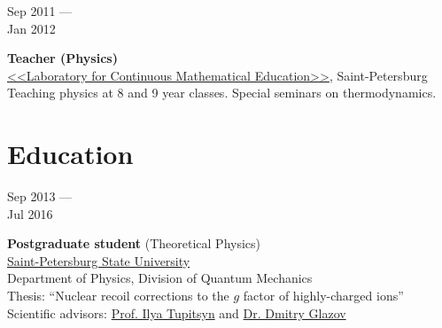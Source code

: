 \documentclass[10pt,a4paper]{article}
\newcommand{\lmpratio}{0.15}
\newcommand{\rmpratio}{0.74}
\newcommand{\verticalSpace}{0.3cm}
\newcommand{\vSpace}{0.5cm}
\newcommand{\horizontalSpace}{0.05\textwidth}
\newcommand{\sectionMain}[1]{\textbf{#1}}
\begin{document}
		\vspace{\vSpace}
	
	\begin{minipage}[t]{\lmpratio\textwidth}
		Sep 2011 --- \\Jan 2012
	\end{minipage}
	\hspace{\horizontalSpace}
	\begin{minipage}[t]{\rmpratio\textwidth}
		\sectionMain{Teacher (Physics)}\\
		\href{http://lnmo.ru/}{<<Laboratory for Continuous Mathematical Education>>}, Saint-Petersburg\\[0.5cm]
		Teaching physics at 8 and 9 year classes. Special seminars on thermodynamics.
	\end{minipage}	
	\vspace{\verticalSpace}
	\vspace{\verticalSpace}
	\section*{Education}
	
	\begin{minipage}[t]{\lmpratio\textwidth}
		Sep 2013 --- \\Jul 2016
	\end{minipage}
	\hspace{\horizontalSpace}
	\begin{minipage}[t]{\rmpratio\textwidth}
		\sectionMain{Postgraduate student} (Theoretical Physics)\\[0.1cm]		
		\href{http://english.spbu.ru/}{Saint-Petersburg State University}\\ Department of Physics, Division of Quantum Mechanics\\[0.3cm]
		 Thesis: ``Nuclear recoil corrections to the $g$ factor of highly-charged ions'' \\[0.3cm]
		 Scientific advisors: \href{http://fock.phys.spbu.ru/english/tupicin_en.htm}{Prof. Ilya Tupitsyn} and \href{http://fock.phys.spbu.ru/glazov.htm}{Dr. Dmitry Glazov}
	\end{minipage}

	\vspace{1cm}
	
\end{document}

